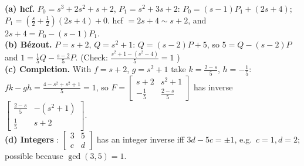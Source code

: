\begin{workbox}[title={Worked examples}]
\textbf{(a) hcf.} $P_0=s^3+2s^2+s+2$, $P_1=s^2+3s+2$: $P_0=(s-1)P_1+(2s+4)$; $P_1=(\frac s2+\frac12)(2s+4)+0$. hcf $=2s+4\sim s+2$, and $2s+4=P_0-(s-1)P_1$.\\
\textbf{(b) B\'ezout.} $P=s+2$, $Q=s^2+1$: $Q=(s-2)P+5$, so $5=Q-(s-2)P$ and $\boxed{1=\tfrac15Q-\tfrac{s-2}5P}$. (Check: $\frac{s^2+1-(s^2-4)}5=1$ \checkmark)\\
\textbf{(c) Completion.} With $f=s+2$, $g=s^2+1$ take $k=\frac{2-s}5$, $h=-\frac15$: $fk-gh=\frac{4-s^2+s^2+1}5=1$, so $F=\begin{bmatrix}s+2&s^2+1\\-\frac15&\frac{2-s}5\end{bmatrix}$ has inverse $\begin{bmatrix}\frac{2-s}5&-(s^2+1)\\\frac15&s+2\end{bmatrix}$.\\
\textbf{(d) Integers} : $\begin{bmatrix}3&5\\c&d\end{bmatrix}$ has an integer inverse iff $3d-5c=\pm1$, e.g.\ $c=1,d=2$; possible because $\gcd(3,5)=1$.
\end{workbox}


